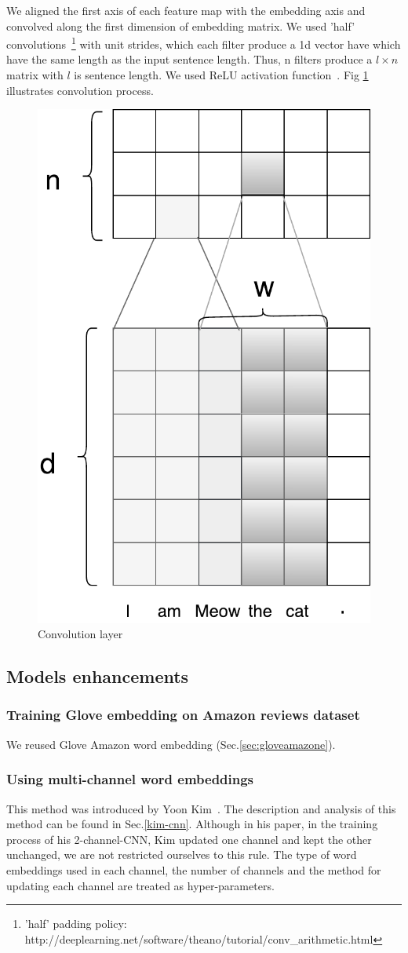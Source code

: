 We aligned the first axis of each feature map with the embedding axis and convolved along the first dimension of embedding matrix.
We used 'half' convolutions~\footnote{'half' padding policy: http://deeplearning.net/software/theano/tutorial/conv\_arithmetic.html} with unit strides, which each filter produce a 1d vector have which have the same length as the input sentence length.
Thus, n filters produce a $l \times n$ matrix with $l$ is sentence length.
We used ReLU activation function~\cite{hahnloser2000digital}. Fig \ref{fig:convlayer} illustrates convolution process.



\begin{figure}[H]
    \centering
    \includegraphics[width=0.4\linewidth]{figure/convlayer}
    \caption[Convolution layer]{Convolution layer}
    \label{fig:convlayer}
\end{figure}

\subsection{Models enhancements}\label{sec:model-enhan}
\subsubsection{Training Glove embedding on Amazon reviews dataset}\label{sec:reuse-glove-amazon}
We reused Glove Amazon word embedding (Sec.\ref{sec:gloveamazone}).

\subsubsection{Using multi-channel word embeddings}\label{sec:enhan-multi-channel}
This method was introduced by Yoon Kim~\cite{KimCNN}.
The description and analysis of this method can be found in Sec.\ref{kim-cnn}.
Although in his paper, in the training process of his 2-channel-CNN, Kim updated one channel and kept the other unchanged, we are not restricted ourselves to this rule.
The type of word embeddings used in each channel, the number of channels and the method for updating each channel are treated as hyper-parameters.

